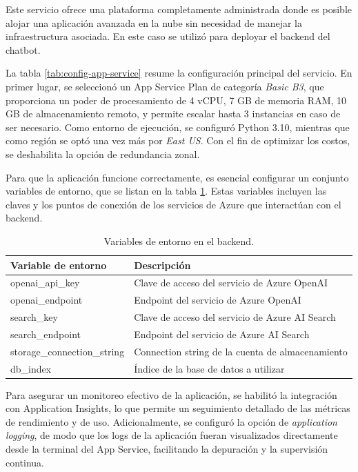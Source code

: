 Este servicio ofrece una plataforma completamente administrada donde es posible alojar una aplicación avanzada en la nube 
sin necesidad de manejar la infraestructura asociada. En este caso se utilizó para deployar el backend del chatbot.

La tabla \ref{tab:config-app-service} resume la configuración principal del servicio. En primer lugar, se seleccionó un App Service Plan de categoría \textit{Basic B3}, que proporciona un poder de procesamiento de 
4 vCPU, 7 GB de memoria RAM, 10 GB de almacenamiento remoto, y permite escalar hasta 3 instancias en caso de ser necesario. 
Como entorno de ejecución, se configuró Python 3.10, mientras que como región se optó una vez más por \textit{East US}. Con el 
fin de optimizar los costos, se deshabilita la opción de redundancia zonal.

Para que la aplicación funcione correctamente, es esencial configurar un conjunto variables de entorno, que se listan en la tabla \ref{tab:config-env}. Estas 
variables incluyen las claves y los puntos de conexión de los servicios de Azure que interactúan con el backend. 

\begin{table}[h]
	\centering
	\caption[Variables de entorno en el backend]{Variables de entorno en el backend.}
	\begin{tabular}{l l}    
		\toprule
		\textbf{Variable de entorno}  & \textbf{Descripción} 	                          \\
		\midrule
		openai\_api\_key              &	Clave de acceso del servicio de Azure OpenAI 	  \\		
		openai\_endpoint              & Endpoint del servicio de Azure OpenAI			  \\
		search\_key                   & Clave de acceso del servicio de Azure AI Search   \\
		search\_endpoint	          & Endpoint del servicio de Azure AI Search		  \\
        storage\_connection\_string   & Connection string de la cuenta de almacenamiento  \\
		db\_index	                  & Índice de la base de datos a utilizar		      \\
		\bottomrule
		\hline
	\end{tabular}
	\label{tab:config-env}
\end{table}

Para asegurar un monitoreo efectivo de la aplicación, se habilitó la integración con Application Insights, lo que permite un 
seguimiento detallado de las métricas de rendimiento y de uso. Adicionalmente, se configuró la opción de \textit{application logging}, 
de modo que los logs de la aplicación fueran visualizados directamente desde la terminal del App Service, facilitando la depuración 
y la supervisión continua.

